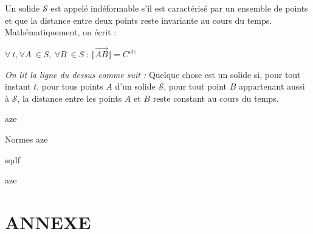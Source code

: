 \documentclass[
	11pt, %
	fleqn, %
	a4paper, %
]{LegrandOrangeBook}
\begin{document}
\begin{definition}
Un solide $\mathcal{S}$ est appelé indéformable s'il est caractérisé par un ensemble de points et que la distance entre deux points reste invariante au cours du temps. Mathématiquement, on écrit :


    $ \forall \ t,\forall A\ \in S,\ \forall B\ \in S\ :\ \Vert \overrightarrow{AB}\Vert =C^{cte} \ $ 


\textit{On lit la ligne du dessus comme suit :} Quelque chose est un solide si, pour tout instant $t$, pour tous points $A$ d'un solide $\mathcal{S}$, pour tout point $B$ appartenant aussi à $\mathcal{S}$, la distance entre les points $A$ et $B$ reste constant au cours du temps.
\end{definition}



\begin{corollary}[S2.4] 
aze
\end{corollary}

\begin{definition}{Normes}
aze
\end{definition}

\begin{theorem}
    sqdf
\end{theorem}

\begin{remark}
    aze
\end{remark}







\chapterspaceabove{6.25cm} %
\chapterspacebelow{7.5cm} %



	




\newpage
\section{ANNEXE}


{} %
\printindex %
\end{document}
